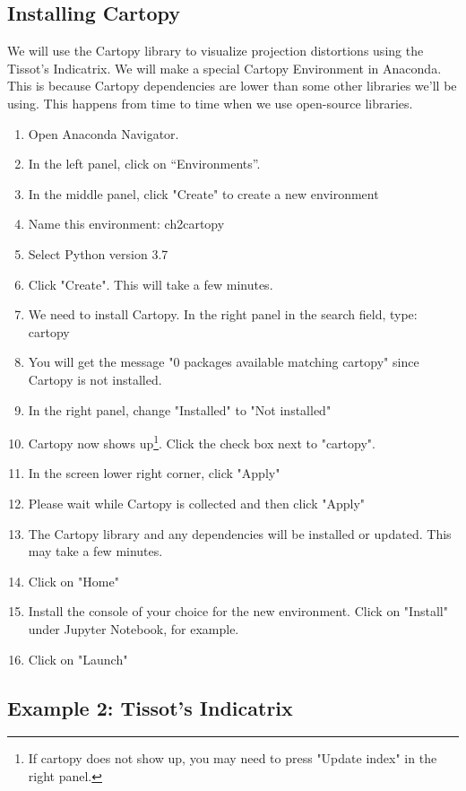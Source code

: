 \documentclass[a4paper , 12pt]{book}
\begin{document}
\subsection*{Installing Cartopy}

We will use the Cartopy library to visualize projection distortions using the Tissot’s Indicatrix. We will make a special Cartopy Environment in Anaconda. This is because Cartopy dependencies are lower than some other libraries we’ll be using. This happens from time to time when we use open-source libraries.

\begin{enumerate}
    \item Open Anaconda Navigator.
    \item In the left panel, click on “Environments”.
    \item In the middle panel, click "Create" to create a new environment
    \item Name this environment: ch2cartopy
    \item Select Python version 3.7
    \item Click "Create". This will take a few minutes.
    \item We need to install Cartopy. In the right panel in the search field, type: cartopy
    \item You will get the message "0 packages available matching cartopy" since Cartopy is not installed.
    \item In the right panel, change "Installed" to "Not installed"
    \item Cartopy now shows up\footnote{If cartopy does not show up, you may need to press "Update index" in the right panel.}. Click the check box next to "cartopy".
    \item In the screen lower right corner, click "Apply"
    \item Please wait while Cartopy is collected and then click "Apply"
    \item The Cartopy library and any dependencies will be installed or updated. This may take a few minutes.
    \item Click on "Home"
    \item Install the console of your choice for the new environment. Click on "Install" under Jupyter Notebook, for example.
    \item Click on "Launch"
\end{enumerate}

\subsection*{Example 2: Tissot's Indicatrix}
\end{document}
